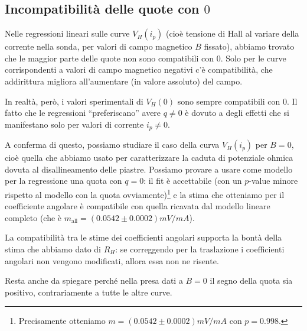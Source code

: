 
\subsection{Incompatibilità delle quote con $ 0 $}

Nelle regressioni lineari sulle curve $ V_H(i_p) $ (cioè tensione di Hall al variare della corrente nella sonda, per valori di campo magnetico $ B $ fissato), abbiamo trovato che le maggior parte delle quote non sono compatibili con $ 0 $.
Solo per le curve corrispondenti a valori di campo magnetico negativi c'è compatibilità, che addirittura migliora all'aumentare (in valore assoluto) del campo.

In realtà, però, i valori sperimentali di $ V_H(0) $ sono sempre compatibili con $ 0 $.
Il fatto che le regressioni ``preferiscano'' avere $ q \neq 0 $ è dovuto a degli effetti che si manifestano solo per valori di corrente $ i_p \neq 0 $.

A conferma di questo, possiamo studiare il caso della curva $ V_H(i_p) $ per $ B=0 $, cioè quella che abbiamo usato per caratterizzare la caduta di potenziale ohmica dovuta al disallineamento delle piastre.
Possiamo provare a usare come modello per la regressione una quota con $ q=0 $: il fit è accettabile (con un $ p $-value minore rispetto al modello con la quota ovviamente)\footnote{Precisamente otteniamo $ m = (0.0542 \pm 0.0002) \unit{mV/mA} $ con $ p = 0.998 $.} e la stima che otteniamo per il coefficiente angolare è compatibile con quella ricavata dal modello lineare completo (che è $ m_\text{all} = (0.0542 \pm 0.0002) \unit{mV/mA} $).

La compatibilità tra le stime dei coefficienti angolari supporta la bontà della stima che abbiamo dato di $ R_H $: se correggendo per la traslazione i coefficienti angolari non vengono modificati, allora essa non ne risente.

Resta anche da spiegare perché nella presa dati a $ B=0 $ il segno della quota sia positivo, contrariamente a tutte le altre curve.

